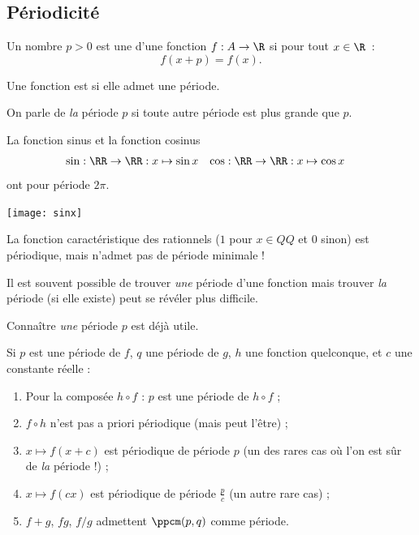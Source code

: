 \subsection{Périodicité}
\begin{frame}
  \begin{definition}
    Un nombre $p > 0$ est une  d'une fonction $f : A \to \R$ si pour tout $x \in \R$~:
    \begin{equation*}
      f(x+p) = f(x).
    \end{equation*}\pause

    Une fonction est  si elle admet une période.\pause

    On parle de \emph{la} période \(p\) si toute autre période est plus grande que \(p\).
  \end{definition}\pause
  \begin{example}
    La fonction sinus et la fonction cosinus
    \begin{align*}
      \sin &: \RR \to \RR : x \mapsto \sin x &        \cos &: \RR \to \RR : x \mapsto \cos x 
    \end{align*}\pause
    ont pour période \(2\pi\).\pause
    \begin{center}
      \texttt{[image: sinx]}
    \end{center}
  \end{example}
\end{frame}
\begin{frame}
\begin{example}
    La fonction caractéristique des rationnels (\(1\) pour \(x \in QQ\) et \(0\) sinon)\pause{} est périodique,\pause{} mais n'admet pas de période minimale !
  \end{example}
\end{frame}
\begin{frame}
  \begin{remark*}
    Il est souvent possible de trouver \emph{une} période d'une fonction\pause{} mais trouver \emph{la} période (si elle existe) peut se révéler plus difficile.\pause

    Connaître \emph{une} période \(p\) est déjà utile.
  \end{remark*}
  
  Si \(p\) est une période de \(f\), \(q\) une période de \(g\), \(h\) une fonction quelconque, et \(c\) une constante réelle :\pause
  \begin{enumerate}[<+->]
  \item Pour la composée \(h\circ f\) :\pause{} \(p\) est une période de \(h\circ f\) ;
  \item \(f\circ h\) n'est pas a priori périodique (mais peut l'être) ;
  \item \(x \mapsto f(x+c)\) est périodique de période \(p\) (un des rares cas où l'on est sûr de \emph{la} période !) ;
  \item \(x \mapsto f(cx)\) est périodique de période \(\frac pc\) (un autre rare cas) ;
  \item \(f+g\), \(fg\), \(f/g\) admettent \(\ppcm(p,q)\) comme période.
  \end{enumerate}
\end{frame}
